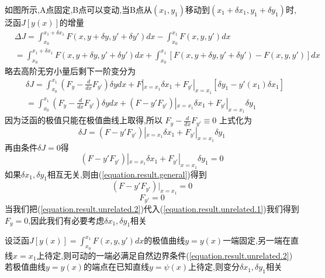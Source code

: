 \documentclass{book}
\begin{document}
如图所示,A点固定,B点可以变动,当B点从$(x_1,y_1)$移动到$(x_1+\delta x_1,y_1+\delta y_1)$时,泛函$ J[y(x)]$的增量
\begin{equation}
     \begin{split}
         & \Delta J=\int_{x_0}^{x_1+\delta x_1}F(x,y+\delta y,y'+\delta y')dx-\int_{x_0}^{x_1}F(x,y,y')dx\\
         & =\int_{x_0}^{x_1+\delta x_1}F(x,y+\delta y,y'+\delta y')dx+\int_{x_0}^{x_1}[F(x,y+\delta y,y'+\delta y')-F(x,y,y')]dx
     \end{split}
\end{equation}
略去高阶无穷小量后剩下一阶变分为
\begin{equation}
\begin{split}
    &  \delta J=\int_{x_0}^{x_1}(F_y - \frac{d}{dx}F_{y'} )\delta y dx + F|_{x=x_1}\delta x_1 + F_{y'}|_{x=x_1}[\delta y_1 - y'(x_1)\delta x_1] \\
    & =\int_{x_0}^{x_1}(F_y - \frac{d}{dx}F_{y'} )\delta y dx + (F-y'F_{y'})|_{x=x_1}\delta x_1 +F_{y'}|_{x=x_1}\delta y_1
\end{split}
\end{equation}
因为泛函的极值只能在极值曲线上取得,所以
$F_y - \frac{d}{dx}F_{y'} \equiv0$
上式化为
\begin{equation}
     \delta J=(F-y'F_{y'})|_{x=x_1}\delta x_1 +F_{y'}|_{x=x_1}\delta y_1
\end{equation}
再由条件$\delta J=0$得
\begin{equation}
     (F-y'F_{y'})|_{x=x_1}\delta x_1 +F_{y'}|_{x=x_1}\delta y_1=0
     \label{equation.result.general}
\end{equation}
如果$\delta x_1,\delta y_1$相互无关,则由(\ref{equation.result.general})得到
\begin{equation}
(F-y'F_{y'})|_{x=x_1}=0
\label{equation.result.unrelated.1}
\end{equation}
\begin{equation}
F_{y'}=0
\label{equation.result.unrelated.2}
\end{equation}
当我们把(\ref{equation.result.unrelated.2})代入(\ref{equation.result.unrelated.1})我们得到$F_y=0$,因此我们有必要考虑$\delta x_1,\delta y_1$相关
\begin{theorem}
设泛函$J[y(x)]=\int_{x_0}^{x_1}F(x,y,y')dx$的极值曲线$y=y(x)$一端固定,另一端在直线$x=x_1$上待定,则可动的一端必满足自然边界条件(\ref{equation.result.unrelated.2})
若极值曲线$y=y(x)$的端点在已知直线$y=\psi(x)$上待定,则变分$\delta x_1,\delta y_1$相关
\end{theorem}
\end{document}
